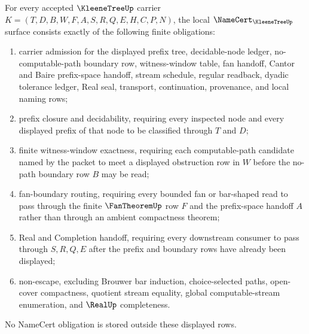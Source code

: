 \begin{theorem}
\label{thm:kleene-tree-namecert-obligations}
For every accepted $\KleeneTreeUp$ carrier $K=(T,D,B,W,F,A,S,R,Q,E,H,C,P,N)$, the local $\NameCert_{\KleeneTreeUp}$ surface consists exactly of the following finite obligations:
\begin{enumerate}
\item carrier admission for the displayed prefix tree, decidable-node ledger, no-computable-path boundary row, witness-window table, fan handoff, Cantor and Baire prefix-space handoff, stream schedule, regular readback, dyadic tolerance ledger, Real seal, transport, continuation, provenance, and local naming rows;
\item prefix closure and decidability, requiring every inspected node and every displayed prefix of that node to be classified through $T$ and $D$;
\item finite witness-window exactness, requiring each computable-path candidate named by the packet to meet a displayed obstruction row in $W$ before the no-path boundary row $B$ may be read;
\item fan-boundary routing, requiring every bounded fan or bar-shaped read to pass through the finite $\FanTheoremUp$ row $F$ and the prefix-space handoff $A$ rather than through an ambient compactness theorem;
\item Real and Completion handoff, requiring every downstream consumer to pass through $S,R,Q,E$ after the prefix and boundary rows have already been displayed;
\item non-escape, excluding Brouwer bar induction, choice-selected paths, open-cover compactness, quotient stream equality, global computable-stream enumeration, and $\RealUp$ completeness.
\end{enumerate}
No NameCert obligation is stored outside these displayed rows.
\end{theorem}
